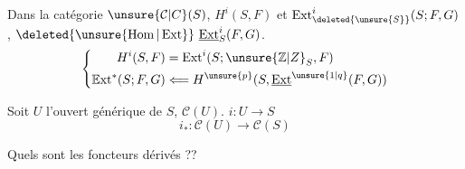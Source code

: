 
Dans la catégorie $\unsure{\mathcal C|C}(S)$, 
$H^i(S,F)$ et $\operatorname{Ext}^{i}_{\deleted{\unsure{S}}}(S;F,G)$,
$\deleted{\unsure{\operatorname{Hom}|\operatorname{Ext}}}\ \underline{\operatorname{Ext}}^i_S(F,G)$.
\[
\left\{\begin{aligned}
H^i(S,F)&=\operatorname{Ext}^i(S;\unsure{\mathbb Z|Z}_S,F)\\
\mathbb E\mathrm{xt}^{*}(S;F,G)&\Longleftarrow
 H^{\unsure{p}}(S,\underline{\operatorname{Ext}}^{\unsure{1|q}}(F,G))
\end{aligned}\right.
\]

Soit $U$ l'ouvert générique de $S$,  $\mathcal C(U)$.
 $i:U\longrightarrow S$
\[
i_*:\mathcal C(U)\longrightarrow\mathcal C(S)
\]

Quels sont les foncteurs dérivés ??

